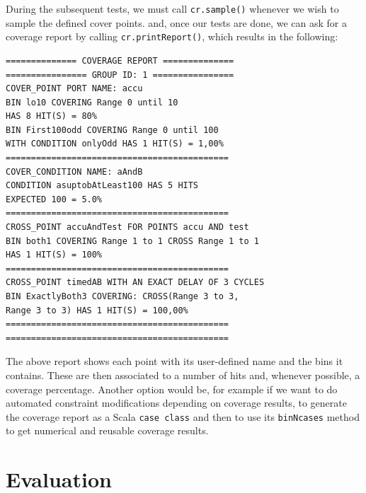 \documentclass[conference]{IEEEtran}
\begin{document}
During the subsequent tests, we must call \texttt{cr.sample()} whenever we wish to sample the defined cover points.%
and, once our tests are done, we can ask for a coverage report by calling \texttt{cr.printReport()}, which results in the following: 
\begin{verbatim}
============== COVERAGE REPORT ==============
================ GROUP ID: 1 ================
COVER_POINT PORT NAME: accu
BIN lo10 COVERING Range 0 until 10 
HAS 8 HIT(S) = 80%
BIN First100odd COVERING Range 0 until 100 
WITH CONDITION onlyOdd HAS 1 HIT(S) = 1,00%
============================================
COVER_CONDITION NAME: aAndB
CONDITION asuptobAtLeast100 HAS 5 HITS 
EXPECTED 100 = 5.0%
============================================
CROSS_POINT accuAndTest FOR POINTS accu AND test
BIN both1 COVERING Range 1 to 1 CROSS Range 1 to 1 
HAS 1 HIT(S) = 100%
============================================
CROSS_POINT timedAB WITH AN EXACT DELAY OF 3 CYCLES
BIN ExactlyBoth3 COVERING: CROSS(Range 3 to 3, 
Range 3 to 3) HAS 1 HIT(S) = 100,00%
============================================
============================================
\end{verbatim}
The above report shows each point with its user-defined name and the bins it contains. These are then associated to a number of hits and, whenever possible, a coverage percentage.
Another option would be, for example if we want to do automated constraint modifications depending on coverage results, to generate the coverage report as a Scala \texttt{case class} and then to use its \texttt{binNcases} method to get numerical and reusable coverage results.  

\section{Evaluation}
\end{document}
